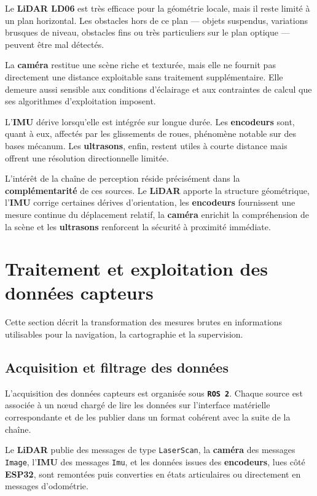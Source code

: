 \documentclass[11pt,a4paper]{report}
\newcommand{\kw}[1]{\textbf{#1}}
\newcommand{\outil}[1]{\textbf{\texttt{#1}}}
\begin{document}
Le \kw{LiDAR LD06} est très efficace pour la géométrie locale, mais il reste limité à un plan horizontal. Les obstacles hors de ce plan --- objets suspendus, variations brusques de niveau, obstacles fins ou très particuliers sur le plan optique --- peuvent être mal détectés.

La \kw{caméra} restitue une scène riche et texturée, mais elle ne fournit pas directement une distance exploitable sans traitement supplémentaire. Elle demeure aussi sensible aux conditions d’éclairage et aux contraintes de calcul que ses algorithmes d’exploitation imposent.

L’\kw{IMU} dérive lorsqu’elle est intégrée sur longue durée. Les \kw{encodeurs} sont, quant à eux, affectés par les glissements de roues, phénomène notable sur des bases mécanum. Les \kw{ultrasons}, enfin, restent utiles à courte distance mais offrent une résolution directionnelle limitée.

L’intérêt de la chaîne de perception réside précisément dans la \kw{complémentarité} de ces sources. Le \kw{LiDAR} apporte la structure géométrique, l’\kw{IMU} corrige certaines dérives d’orientation, les \kw{encodeurs} fournissent une mesure continue du déplacement relatif, la \kw{caméra} enrichit la compréhension de la scène et les \kw{ultrasons} renforcent la sécurité à proximité immédiate.

\section{Traitement et exploitation des données capteurs}

Cette section décrit la transformation des mesures brutes en informations utilisables pour la navigation, la cartographie et la supervision.

\subsection{Acquisition et filtrage des données}

L’acquisition des données capteurs est organisée sous \outil{ROS 2}. Chaque source est associée à un nœud chargé de lire les données sur l’interface matérielle correspondante et de les publier dans un format cohérent avec la suite de la chaîne.

Le \kw{LiDAR} publie des messages de type \texttt{LaserScan}, la \kw{caméra} des messages \texttt{Image}, l’\kw{IMU} des messages \texttt{Imu}, et les données issues des \kw{encodeurs}, lues côté \kw{ESP32}, sont remontées puis converties en états articulaires ou directement en messages d’odométrie.
\end{document}
